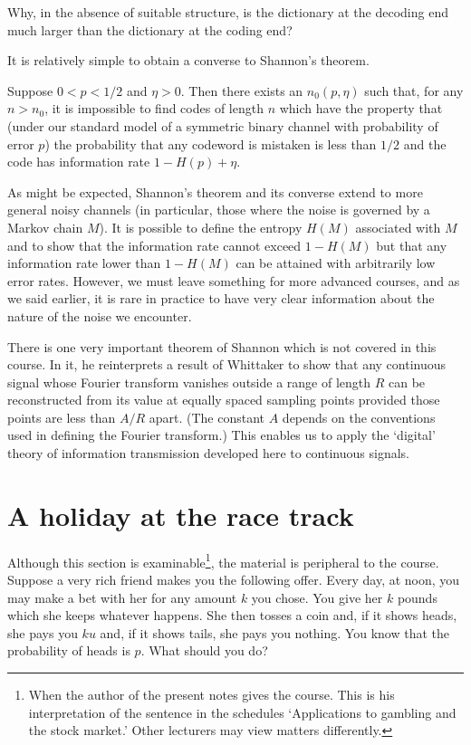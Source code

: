 \begin{exercise} Why, in the absence of suitable
structure, 
is the dictionary at the decoding
end much larger than the dictionary at the
coding end?
\end{exercise}

It is relatively simple to obtain a converse
to Shannon's theorem.
\begin{theorem}\label{T;Shannon converse}
Suppose $0<p<1/2$ and $\eta>0$.
Then there exists an $n_{0}(p,\eta)$ such that,
for any $n>n_{0}$, it is impossible
to find codes of
length $n$ which have the property
that (under our standard model
of  a symmetric binary
channel with probability of error $p$) the probability
that any codeword is mistaken is less than
$1/2$ and the code has
information rate $1-H(p)+\eta$.
\end{theorem}

As might be expected, Shannon's theorem 
and its converse extend
to more general noisy channels (in particular,  those 
where the noise is governed by a Markov chain $M$).
It is possible to define the entropy $H(M)$ 
associated with $M$
and to show that the information
rate cannot exceed $1-H(M)$ but that any
information rate lower than $1-H(M)$ can 
be attained with arbitrarily low error rates.
However, we must leave something for more
advanced courses, and as we said earlier, 
it is rare in practice to have very clear 
information about the nature of the noise 
we encounter.

There is one very important theorem of Shannon
which is not covered in this course. In it, he reinterprets
a result of Whittaker to show that any continuous signal 
whose Fourier transform vanishes outside a range of length
$R$ can be
reconstructed from its value at equally spaced
sampling points provided those points are less than $A/R$
apart. (The constant $A$ depends on the conventions used
in defining the Fourier transform.) This enables us
to apply the `digital' theory of information transmission
developed here to continuous signals.
\section{A holiday at the race track}\label{S;race track}
Although this section is examinable\footnote{When the
author of the present notes gives the course.
This is his interpretation of the sentence in the schedules
`Applications to gambling and the stock market.'
Other lecturers may view matters differently.},
the material is peripheral to the course.
Suppose a very rich friend makes you the following
offer. Every day, at noon, you may make a bet with her
for any amount $k$ you chose. You give her $k$
pounds which she keeps whatever happens.
She then tosses a coin
and, if it shows heads, she pays you $ku$
and, if it shows tails, she pays you nothing.
You know that the probability
of heads is $p$.
What should you do?

